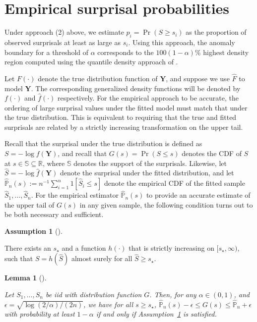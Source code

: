 \documentclass[
  12pt]{article}
\theoremstyle{definition}
\newtheorem{definition}{Assumption}[section]
\theoremstyle{plain}
\theoremstyle{plain}
\theoremstyle{plain}
\newtheorem{lemma}{Lemma}[section]
\theoremstyle{remark}
\begin{document}
\section{Empirical surprisal probabilities}\label{sec-empirical}

Under approach (2) above, we estimate \(p_i=\Pr(S \ge s_i)\) as the
proportion of observed surprisals at least as large as \(s_i\). Using
this approach, the anomaly boundary for a threshold of \(\alpha\)
corresponds to the \(100(1-\alpha)\)\% highest density region computed
using the quantile density approach of \citet{HDR96}.

Let \(F(\cdot)\) denote the true distribution function of \(\bm{Y}\),
and suppose we use \(\widehat{F}\) to model \(\bm{Y}\). The
corresponding generalized density functions will be denoted by
\(f(\cdot)\) and \(\widehat{f}(\cdot)\) respectively. For the empirical
approach to be accurate, the ordering of large surprisal values under
the fitted model must match that under the true distribution. This is
equivalent to requiring that the true and fitted surprisals are related
by a strictly increasing transformation on the upper tail.

Recall that the surprisal under the true distribution is defined as
\(S=-\log f(\bm{Y})\), and recall that \(G(s)=\Pr(S\le s)\) denotes the
CDF of \(S\) at \(s\in\mathbb{S}\subseteq\mathbb{R}\), where
\(\mathbb{S}\) denotes the support of the surprisals. Likewise, let
\(\widehat{S}=-\log \widehat{f}(\bm{Y})\) denote the surprisal under the
fitted distribution, and let
\(\widehat{\mathbb{P}}_n(s):=n^{-1}\sum_{i=1}^{n}1[\widehat{S}_i\le s]\)
denote the empirical CDF of the fitted sample
\(\widehat{S}_1,\dots,\widehat{S}_n\). For the empirical estimator
\(\widehat{\mathbb{P}}_n(s)\) to provide an accurate estimate of the
upper tail of \(G(s)\) in any given sample, the following condition
turns out to be both necessary and sufficient.

\begin{definition}[]\protect\hypertarget{def-empirical_pis}{}\label{def-empirical_pis}

There exists an \(s_\star\) and a function \(h(\cdot)\) that is strictly
increasing on \([s_\star, \infty)\), such that \(S=h(\widehat{S})\)
almost surely for all \(\widehat{S} \ge s_\star\).

\end{definition}

\begin{lemma}[]\protect\hypertarget{lem-confident}{}\label{lem-confident}

Let \(S_1,\dots, S_n\) be iid with distribution function \(G\). Then,
for any \(\alpha \in(0,1)\), and
\(\epsilon = \sqrt{\log(2/\alpha)/(2n)}\), we have for all
\(s \ge s_\star\),
\(\widehat{\mathbb{P}}_n(s)-\epsilon \leq G(s) \leq \widehat{\mathbb{P}}_n+\epsilon\)
with probability at least \(1-\alpha\) if and only if
Assumption~\ref{def-empirical_pis} is satisfied.

\end{lemma}
\end{document}

